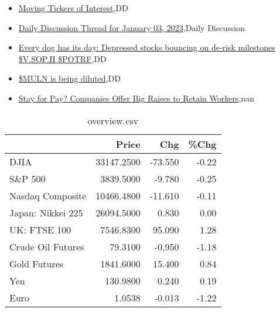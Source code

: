 \documentclass{article}%
\begin{document}
%
\begin{itemize}%
\item%
\href{https://reddit.com/r/wallstreetbets/comments/1027hik/moving\_tickers\_of\_interest/}{Moving Tickers of Interest},DD%
\item%
\href{https://reddit.com/r/wallstreetbets/comments/1025753/daily\_discussion\_thread\_for\_january\_03\_2023/}{Daily Discussion Thread for January 03, 2023},Daily Discussion%
\item%
\href{https://reddit.com/r/Baystreetbets/comments/1026h6r/every\_dog\_has\_its\_day\_depressed\_stocks\_bouncing/}{Every dog has its day: Depressed stocks bouncing on de-risk milestones \$V.SOP.H \$POTRF},DD%
\item%
\href{https://reddit.com/r/Baystreetbets/comments/101xfpf/muln\_is\_being\_diluted/}{\$MULN is being diluted},DD%
\item%
\href{https://reddit.com/r/Economics/comments/102010c/stay\_for\_pay\_companies\_offer\_big\_raises\_to\_retain/}{Stay for Pay? Companies Offer Big Raises to Retain Workers},nan%
\end{itemize}%


\begin{table}[htbp]%
\caption{overview.csv}%
\centering%
\begin{adjustbox}{width=1\textwidth}%
\begin{tabular}{lrrr}
\toprule
                  &      Price &     Chg &  \%Chg \\
\midrule
             DJIA & 33147.2500 & -73.550 & -0.22 \\
          S\&P 500 &  3839.5000 &  -9.780 & -0.25 \\
 Nasdaq Composite & 10466.4800 & -11.610 & -0.11 \\
Japan: Nikkei 225 & 26094.5000 &   0.830 &  0.00 \\
     UK: FTSE 100 &  7546.8300 &  95.090 &  1.28 \\
Crude Oil Futures &    79.3100 &  -0.950 & -1.18 \\
     Gold Futures &  1841.6000 &  15.400 &  0.84 \\
              Yen &   130.9800 &   0.240 &  0.19 \\
             Euro &     1.0538 &  -0.013 & -1.22 \\
\bottomrule
\end{tabular}
%
\end{adjustbox}%
\end{table}

%
\end{document}
